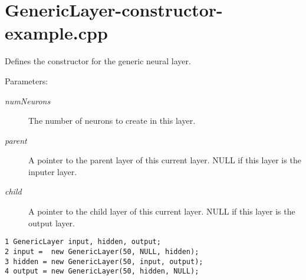 \hypertarget{GenericLayer-constructor-example_8cpp-example}{
\section{Generic\-Layer-constructor-example.cpp}
}
Defines the constructor for the generic neural layer. \begin{Desc}
\item[Parameters:]
\begin{description}
\item[{\em num\-Neurons}]The number of neurons to create in this layer. \item[{\em parent}]A pointer to the parent layer of this current layer. NULL if this layer is the inputer layer. \item[{\em child}]A pointer to the child layer of this current layer. NULL if this layer is the output layer.\end{description}
\end{Desc}


\begin{DocInclude}\begin{verbatim}1 GenericLayer input, hidden, output;
2 input =  new GenericLayer(50, NULL, hidden);
3 hidden = new GenericLayer(50, input, output);
4 output = new GenericLayer(50, hidden, NULL);
\end{verbatim}
\end{DocInclude}
 